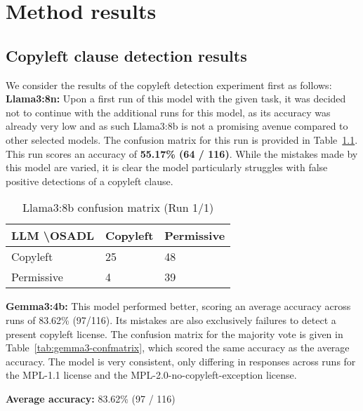 
\chapter{Method results}\label{ch:results}


\section{Copyleft clause detection results}

We consider the results of the copyleft detection experiment first as follows: \\

\textbf{Llama3:8n:} Upon a first run of this model with the given task, it was decided not to continue with the additional runs for this model, as its accuracy was already very low and as such Llama3:8b is not a promising avenue compared to other selected models. The confusion matrix for this run is provided in Table~\ref{tab:llama3-1-confmatrix}. This run scores an accuracy of \textbf{55.17\% (64 / 116)}. While the mistakes made by this model are varied, it is clear the model particularly struggles with false positive detections of a copyleft clause.

\begin{table}[h]
	\caption{Llama3:8b confusion matrix (Run 1/1)}
	\label{tab:llama3-1-confmatrix}
	\centering
	\begin{tabular}{l|ll}
		\hline
		\textbf{LLM \textbackslash OSADL} & Copyleft & Permissive \\ \hline
		Copyleft & 25 & 48 \\
		Permissive & 4 & 39 \\\hline
	\end{tabular}
\end{table}

\textbf{Gemma3:4b:} This model performed better, scoring an average accuracy across runs of 83.62\% (97/116). Its mistakes are also exclusively failures to detect a present copyleft license. The confusion matrix for the majority vote is given in Table~\ref{tab:gemma3-confmatrix}, which scored the same accuracy as the average accuracy. The model is very consistent, only differing in responses across runs for the MPL-1.1 license and the MPL-2.0-no-copyleft-exception license.

\textbf{Average accuracy:} 83.62\% (97 / 116)

